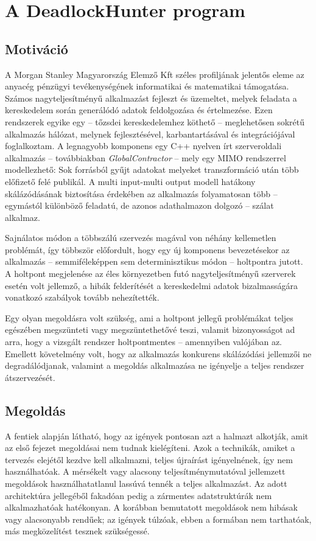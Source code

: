 \chapter{A DeadlockHunter program}
\label{sec:dlhunter}

    \section{Motiváció}
    A Morgan Stanley Magyarország Elemző Kft széles profiljának jelentős eleme az anyacég pénzügyi tevékenységének informatikai és matematikai támogatása. Számos nagyteljesítményű alkalmazást fejleszt és üzemeltet, melyek feladata a kereskedelem során generálódó adatok feldolgozása és értelmezése. Ezen rendszerek egyike egy -- tőzsdei kereskedelemhez köthető -- meglehetősen sokrétű alkalmazás hálózat, melynek fejlesztésével, karbantartásával és integrációjával foglalkoztam. A legnagyobb komponens egy C++ nyelven írt szerveroldali alkalmazás -- továbbiakban \emph{GlobalContractor} -- mely egy MIMO rendszerrel modellezhető: Sok forrásból gyűjt adatokat melyeket transzformáció után több előfizető felé publikál. A multi input-multi output modell hatákony skálázódásának biztosítása érdekében az alkalmazás folyamatosan több -- egymástól különböző feladatú, de azonos adathalmazon dolgozó -- szálat alkalmaz.
    
    Sajnálatos módon a többszálú szervezés magával von néhány kellemetlen problémát, így többször előfordult, hogy egy új komponens bevezetésekor az alkalmazás -- semmiféleképpen sem determinisztikus módon -- holtpontra jutott. A holtpont megjelenése az éles környezetben futó nagyteljesítményű szerverek esetén volt jellemző, a hibák felderítését a kereskedelmi adatok bizalmasságára vonatkozó szabályok tovább nehezítették.
    
    Egy olyan megoldásra volt szükség, ami a holtpont jellegű problémákat teljes egészében megszünteti vagy megszüntethetővé teszi, valamit bizonyosságot ad arra, hogy a vizsgált rendszer holtpontmentes -- amennyiben valójában az. Emellett követelmény volt, hogy az alkalmazás konkurens skálázódási jellemzői ne degradálódjanak, valamint a megoldás alkalmazása ne igényelje a teljes rendszer átszervezését.
    
    \section{Megoldás}
    A fentiek alapján látható, hogy az igények pontosan azt a halmazt alkotják, amit az első fejezet megoldásai nem tudnak kielégíteni. Azok a technikák, amiket a tervezés elejétől kezdve kell alkalmazni, teljes újraírást igényelnének, így nem használhatóak. A mérsékelt vagy alacsony teljesítménymutatóval jellemzett megoldások használhatatlanul lassúvá tennék a teljes alkalmazást. Az adott architektúra jellegéből fakadóan pedig a zármentes adatstruktúrák nem alkalmazhatóak hatékonyan. A korábban bemutatott megoldások nem hibásak vagy alacsonyabb rendűek; az igények túlzóak, ebben a formában nem tarthatóak, más megközelítést tesznek szükségessé.
    
